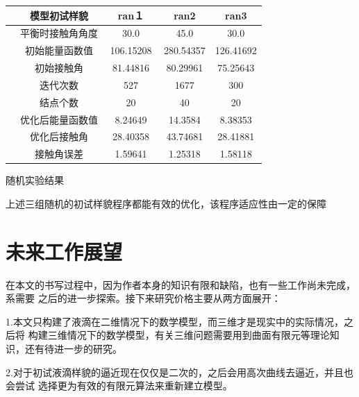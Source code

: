 \documentclass[12pt,oneside,a4paper]{article}
\begin{document}
\begin{center}
\renewcommand\arraystretch{2.2}
\begin{tabular}{|c|c|c|c|}
\hline 
\rule[-1ex]{0pt}{2.5ex}　模型初试样貌 & ran１ & ran2 & ran3 \\ 
\hline 
\rule[-1ex]{0pt}{2.5ex}　平衡时接触角角度 & 30.0 & 45.0 & 30.0 \\ 
\hline 
\rule[-1ex]{0pt}{2.5ex}　初始能量函数值 & 106.15208 & 280.54357 & 126.41692 \\ 
\hline 
\rule[-1ex]{0pt}{2.5ex}　初始接触角 & 81.44816 & 80.29961 & 75.25643 \\ 
\hline 
\rule[-1ex]{0pt}{2.5ex}　迭代次数 & 527 & 1677 & 300 \\ 
\hline
\rule[-1ex]{0pt}{2.5ex}　结点个数 & 20 & 40 & 20 \\ 
\hline  
\rule[-1ex]{0pt}{2.5ex}　优化后能量函数值 & 8.24649 & 14.3584 & 8.38353 \\ 
\hline 
\rule[-1ex]{0pt}{2.5ex}　优化后接触角 & 28.40358　& 43.74681 & 28.41881 \\ 
\hline 
\rule[-1ex]{0pt}{2.5ex}　接触角误差 &1.59641 & 1.25318 & 1.58118 \\ 
\hline 
\end{tabular} 
\centerline{随机实验结果}
\end{center}

上述三组随机的初试样貌程序都能有效的优化，该程序适应性由一定的保障
\newpage


\section{未来工作展望}
在本文的书写过程中，因为作者本身的知识有限和缺陷，也有一些工作尚未完成，系需要
之后的进一步探索。接下来研究价格主要从两方面展开：

1.本文只构建了液滴在二维情况下的数学模型，而三维才是现实中的实际情况，之后将
构建三维情况下的数学模型，有关三维问题需要用到曲面有限元等理论知识，还有待进一步的研究。

2.对于初试液滴样貌的逼近现在仅仅是二次的，之后会用高次曲线去逼近，并且也会尝试
选择更为有效的有限元算法来重新建立模型。

\newpage
\mbox{}
\newpage

\nocite{*}


\newpage
\end{document}
